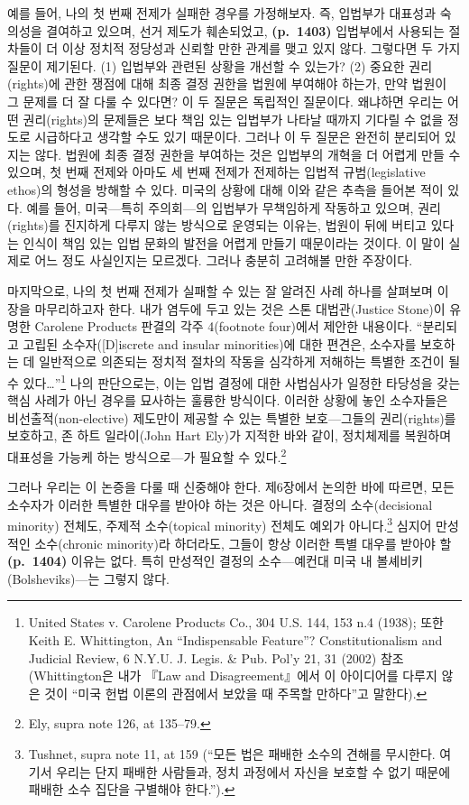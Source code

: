 \documentclass[a4paper,12pt,oneside]{article}  %
\begin{document}
예를 들어, 나의 첫 번째 전제가 실패한 경우를 가정해보자. 즉, 입법부가
대표성과 숙의성을 결여하고 있으며, 선거 제도가 훼손되었고,
\textbf{(p.~1403)} 입법부에서 사용되는 절차들이 더 이상 정치적 정당성과
신뢰할 만한 관계를 맺고 있지 않다. 그렇다면 두 가지 질문이 제기된다. (1)
입법부와 관련된 상황을 개선할 수 있는가? (2) 중요한 권리(rights)에 관한
쟁점에 대해 최종 결정 권한을 법원에 부여해야 하는가, 만약 법원이 그
문제를 더 잘 다룰 수 있다면? 이 두 질문은 독립적인 질문이다. 왜냐하면
우리는 어떤 권리(rights)의 문제들은 보다 책임 있는 입법부가 나타날
때까지 기다릴 수 없을 정도로 시급하다고 생각할 수도 있기 때문이다.
그러나 이 두 질문은 완전히 분리되어 있지는 않다. 법원에 최종 결정 권한을
부여하는 것은 입법부의 개혁을 더 어렵게 만들 수 있으며, 첫 번째 전제와
아마도 세 번째 전제가 전제하는 입법적 규범(legislative ethos)의 형성을
방해할 수 있다. 미국의 상황에 대해 이와 같은 추측을 들어본 적이 있다.
예를 들어, 미국---특히 주의회---의 입법부가 무책임하게 작동하고 있으며,
권리(rights)를 진지하게 다루지 않는 방식으로 운영되는 이유는, 법원이
뒤에 버티고 있다는 인식이 책임 있는 입법 문화의 발전을 어렵게 만들기
때문이라는 것이다. 이 말이 실제로 어느 정도 사실인지는 모르겠다. 그러나
충분히 고려해볼 만한 주장이다.

마지막으로, 나의 첫 번째 전제가 실패할 수 있는 잘 알려진 사례 하나를
살펴보며 이 장을 마무리하고자 한다. 내가 염두에 두고 있는 것은 스톤
대법관(Justice Stone)이 유명한 Carolene Products 판결의 각주 4(footnote
four)에서 제안한 내용이다. ``분리되고 고립된 소수자({[}D{]}iscrete and
insular minorities)에 대한 편견은, 소수자를 보호하는 데 일반적으로
의존되는 정치적 절차의 작동을 심각하게 저해하는 특별한 조건이 될 수
있다\ldots{}''\footnote{United States v. Carolene Products Co., 304 U.S.
  144, 153 n.4 (1938); 또한 Keith E. Whittington, An ``Indispensable
  Feature''? Constitutionalism and Judicial Review, 6 N.Y.U. J. Legis.
  \& Pub. Pol'y 21, 31 (2002) 참조 (Whittington은 내가 『Law and
  Disagreement』에서 이 아이디어를 다루지 않은 것이 ``미국 헌법 이론의
  관점에서 보았을 때 주목할 만하다''고 말한다).} 나의 판단으로는, 이는
입법 결정에 대한 사법심사가 일정한 타당성을 갖는 핵심 사례가 아닌 경우를
묘사하는 훌륭한 방식이다. 이러한 상황에 놓인 소수자들은
비선출적(non-elective) 제도만이 제공할 수 있는 특별한 보호---그들의
권리(rights)를 보호하고, 존 하트 일라이(John Hart Ely)가 지적한 바와
같이, 정치체제를 복원하며 대표성을 가능케 하는 방식으로---가 필요할 수
있다.\footnote{Ely, supra note 126, at 135--79.}

그러나 우리는 이 논증을 다룰 때 신중해야 한다. 제6장에서 논의한 바에
따르면, 모든 소수자가 이러한 특별한 대우를 받아야 하는 것은 아니다.
결정의 소수(decisional minority) 전체도, 주제적 소수(topical minority)
전체도 예외가 아니다.\footnote{Tushnet, supra note 11, at 159 (``모든
  법은 패배한 소수의 견해를 무시한다. 여기서 우리는 단지 패배한
  사람들과, 정치 과정에서 자신을 보호할 수 없기 때문에 패배한 소수
  집단을 구별해야 한다.'').} 심지어 만성적인 소수(chronic minority)라
하더라도, 그들이 항상 이러한 특별 대우를 받아야 할 \textbf{(p.~1404)}
이유는 없다. 특히 만성적인 결정의 소수---예컨대 미국 내
볼셰비키(Bolsheviks)---는 그렇지 않다.
\end{document}
